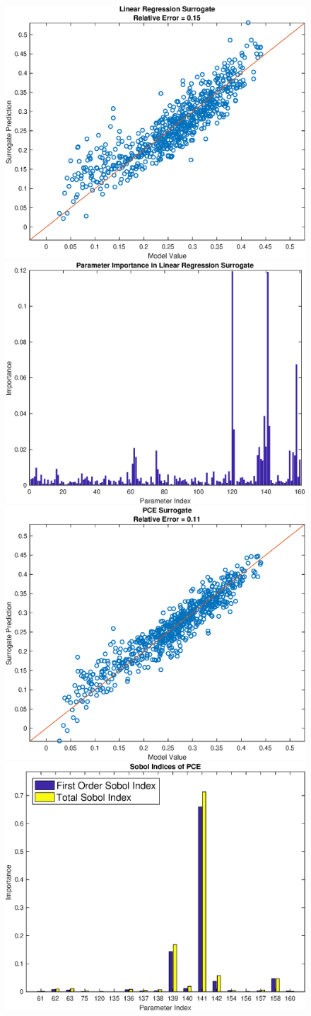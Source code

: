\documentclass[12pt]{article}
\numberwithin{equation}{section}
\begin{document}
\begin{figure}[h]
\centering
\includegraphics[width=.49 \textwidth]{Figures/AM_AMp_Min_QoI_LR_Prediction_Rectangular.eps}
\includegraphics[width=.49 \textwidth]{Figures/AM_AMp_Min_QoI_LR_VI_Rectangular.eps}\\
\includegraphics[width=.49 \textwidth]{Figures/AM_AMp_Min_QoI_PCE_Prediction_Rectangular.eps}
\includegraphics[width=.49 \textwidth]{Figures/AM_AMp_Min_QoI_PCE_SI_Rectangular.eps}
\end{figure}
\end{document}
